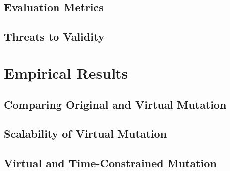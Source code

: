 \subsection{Evaluation Metrics}
\label{sec:evaluation-metrics}

\subsection{Threats to Validity}
\label{sec:threats-to-validity}


\section{Empirical Results}
\label{sec:empirical-results}


\subsection{Comparing Original and Virtual Mutation}
\label{sec:empirical-study-RQ-original-virtual-time}



\subsection{Scalability of Virtual Mutation}
\label{sec:empirical-study-RQ-scalability-mutants-tests}



\subsection{Virtual and Time-Constrained Mutation}
\label{sec:empirical-study-RQ-virtual-time-constrained-virtual}


